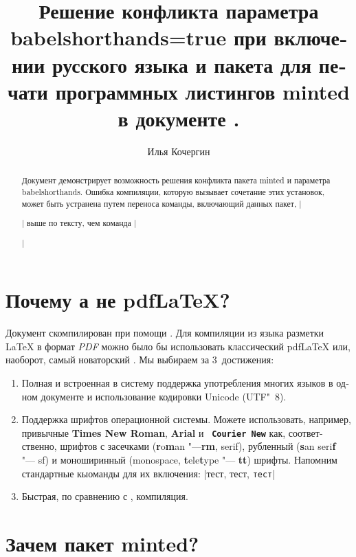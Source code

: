 \documentclass{article}
\author{Илья Кочергин}
\title{Решение конфликта параметра \textsf{babelshorthands=true} при включении русского языка и пакета для печати программных листингов \textsf{minted} в документе \XeLaTeX{}.    }
\begin{document}
	\maketitle
	
	\begin{abstract}
	     Документ демонстрирует возможность решения конфликта пакета minted и параметра babelshorthands. Ошибка компиляции, которую вызывает сочетание этих установок, может быть устранена путем переноса команды, включающий данных пакет,
	     |\usepackage{minted}|
	      выше по тексту, чем команда |\setmainlanguage[babelshorthands=true]{russian}|
	\end{abstract}
	
\section{Почему \XeLaTeX а не {\small pdf}\LaTeX{}? }
	
Документ скомпилирован при помощи \XeLaTeX. Для компиляции из языка разметки \LaTeX{}  в формат \emph{PDF}  можно было бы использовать классический  {\scriptsize pdf}\LaTeX{} или, наоборот, самый новаторский \LuaLaTeX. Мы выбираем \XeLaTeX{} за 3~достижения:

\begin{enumerate}
	\item  Полная и встроенная  в систему поддержка употребления многих языков в одном документе и использование кодировки Unicode (UTF"~8).
	\item  Поддержка шрифтов операционной системы. Можете использовать, например, привычные  \textbf{\rmfamily Times New Roman}, \textbf{\sffamily Arial} и \textbf{\texttt{ Courier New}} как, соответственно, шрифтов с засечками (\textbf{r}o\textbf{m}an "---\textbf{rm}, serif), {\sffamily рубленный (\textbf{s}an seri\textbf{f} "--- sf)} и {\ttfamily моноширинный (monospace, \textbf{t}ele\textbf{t}ype "--- \textbf{tt})}  шрифты. 
	Напомним стандартные кыоманды для их включения: 
		|\textrm{тест}, \textsf{тест}, \texttt{тест}|
		
		
	\item  Быстрая, по сравнению с \LuaLaTeX, компиляция. 
	
\end{enumerate}


\section{Зачем пакет minted?}
\end{document}
